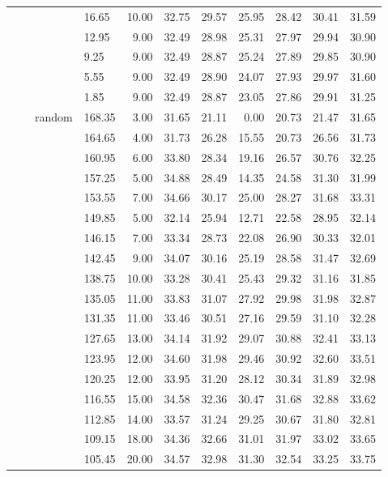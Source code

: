 \begin{longtable}{llllrrrrrrr}
   &  &  & 16.65 & 10.00 & 32.75 & 29.57 & 25.95 & 28.42 & 30.41 & 31.59 \\ 
   &  &  & 12.95 & 9.00 & 32.49 & 28.98 & 25.31 & 27.97 & 29.94 & 30.90 \\ 
   &  &  & 9.25 & 9.00 & 32.49 & 28.87 & 25.24 & 27.89 & 29.85 & 30.90 \\ 
   &  &  & 5.55 & 9.00 & 32.49 & 28.90 & 24.07 & 27.93 & 29.97 & 31.60 \\ 
   &  &  & 1.85 & 9.00 & 32.49 & 28.87 & 23.05 & 27.86 & 29.91 & 31.25 \\ 
   &  & random & 168.35 & 3.00 & 31.65 & 21.11 & 0.00 & 20.73 & 21.47 & 31.65 \\ 
   &  &  & 164.65 & 4.00 & 31.73 & 26.28 & 15.55 & 20.73 & 26.56 & 31.73 \\ 
   &  &  & 160.95 & 6.00 & 33.80 & 28.34 & 19.16 & 26.57 & 30.76 & 32.25 \\ 
   &  &  & 157.25 & 5.00 & 34.88 & 28.49 & 14.35 & 24.58 & 31.30 & 31.99 \\ 
   &  &  & 153.55 & 7.00 & 34.66 & 30.17 & 25.00 & 28.27 & 31.68 & 33.31 \\ 
   &  &  & 149.85 & 5.00 & 32.14 & 25.94 & 12.71 & 22.58 & 28.95 & 32.14 \\ 
   &  &  & 146.15 & 7.00 & 33.34 & 28.73 & 22.08 & 26.90 & 30.33 & 32.01 \\ 
   &  &  & 142.45 & 9.00 & 34.07 & 30.16 & 25.19 & 28.58 & 31.47 & 32.69 \\ 
   &  &  & 138.75 & 10.00 & 33.28 & 30.41 & 25.43 & 29.32 & 31.16 & 31.85 \\ 
   &  &  & 135.05 & 11.00 & 33.83 & 31.07 & 27.92 & 29.98 & 31.98 & 32.87 \\ 
   &  &  & 131.35 & 11.00 & 33.46 & 30.51 & 27.16 & 29.59 & 31.10 & 32.28 \\ 
   &  &  & 127.65 & 13.00 & 34.14 & 31.92 & 29.07 & 30.88 & 32.41 & 33.13 \\ 
   &  &  & 123.95 & 12.00 & 34.60 & 31.98 & 29.46 & 30.92 & 32.60 & 33.51 \\ 
   &  &  & 120.25 & 12.00 & 33.95 & 31.20 & 28.12 & 30.34 & 31.89 & 32.98 \\ 
   &  &  & 116.55 & 15.00 & 34.58 & 32.36 & 30.47 & 31.68 & 32.88 & 33.62 \\ 
   &  &  & 112.85 & 14.00 & 33.57 & 31.24 & 29.25 & 30.67 & 31.80 & 32.81 \\ 
   &  &  & 109.15 & 18.00 & 34.36 & 32.66 & 31.01 & 31.97 & 33.02 & 33.65 \\ 
   &  &  & 105.45 & 20.00 & 34.57 & 32.98 & 31.30 & 32.54 & 33.25 & 33.75 \\ 

\end{longtable}
